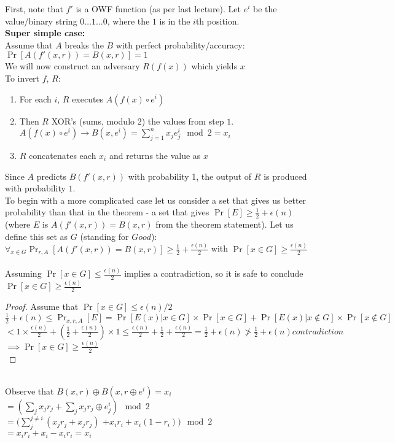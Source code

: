 	First, note that $f'$ is a OWF function (as per last lecture).  Let $e^i$ be the value/binary string $0\ldots1\ldots0$, where the $1$ is in the $i$th position.\\

\textbf{Super simple case:}\\
	Assume that $A$ breaks the $B$ with perfect probability/accuracy: $\Pr[A(f'(x,r)) = B(x,r)] = 1$\\
	We will now construct an adversary $R(f(x))$ which yields $x$\\
	To invert $f$, $R$:
	\begin{enumerate}
		\item For each $i$, $R$ executes $A(f(x) \circ e^i)$
		\item Then $R$ XOR's (sums, modulo 2) the values from step $1$.  $A(f(x) \circ e^i) \rightarrow B(x, e^i) = \sum_{j=1}^n x_j e_j^i \mod 2  = x_i$
		\item $R$ concatenates each $x_i$ and returns the value as $x$
	\end{enumerate}
	Since $A$ predicts $B(f'(x,r))$ with probability 1, the output of $R$ is produced with probability $1$.\\

To begin with a more complicated case let us consider a set that gives us better probability than that in the theorem - a set that gives $\Pr[E] \ge \frac{1}{2} + \epsilon(n)$ (where $E$ is $A(f'(x,r)) = B(x,r)$ from the theorem statement).
Let us define this set as $G$ (standing for $Good$):\\
$\forall_{x \in G} \Pr_{r,A}[A(f'(x,r)) = B(x,r)] \ge \frac{1}{2} + \frac{\epsilon(n)}{2}$ with $\Pr[x \in G] \ge \frac{\epsilon(n)}{2}$ \\
\\
Assuming $\Pr[x \in G] \le \frac{\epsilon(n)}{2}$ implies a contradiction, so it is safe to conclude $\Pr[x \in G] \ge \frac{\epsilon(n)}{2}$\\
\begin{proof}
Assume that $\Pr[x \in G] \le \epsilon(n)/2$\\
$\frac{1}{2}+\epsilon(n) \le \Pr_{x,r,A}[E] = \Pr[E(x) | x \in G] \times \Pr[x \in G] + \Pr[E(x) | x \notin G] \times \Pr[x \notin G]$\\
$< 1 \times \frac{\epsilon(n)}{2} + (\frac{1}{2}+\frac{\epsilon(n)}{2}) \times 1 \le \frac{\epsilon(n)}{2} + \frac{1}{2}+\frac{\epsilon(n)}{2} = \frac{1}{2}+ \epsilon(n) \not> \frac{1}{2}+ \epsilon(n) contradiction$\\
$\implies \Pr[x \in G] \ge \frac{\epsilon(n)}{2}$\\
\end{proof}
\\
	Observe that $B(x,r) \oplus B(x, r\oplus e^i) = x_i$\\
	$= (\sum_j x_j r_j + \sum_j x_j r_j \oplus e^i_j) \mod 2$\\
	$= (\sum_j^{j \not= i} (x_j r_j + x_j r_j)$  $+ x_i r_i + x_i (1-r_i)) \mod 2$\\
	$= x_i r_i + x_i - x_i r_i = x_i$\\\\

